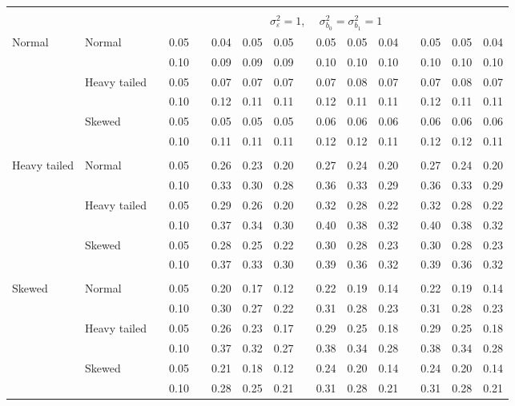 \documentclass[12pt]{article} %
\begin{document}
\begin{table}[ht]
\begin{scriptsize}
\begin{center}
\begin{tabular}{ll p{.1cm} c p{.1cm} rrr p{.1cm} rrr p{.1cm} rrr}
&&&&&&&&&&&&&&&\\
& && && \multicolumn{9}{c}{$\sigma_{\varepsilon}^2 = 1$, \ \ $\sigma_{b_0}^2 = \sigma_{b_1}^2 = 1$} \\ \cline{6-16}
\rowcolor{gray!20}Normal       & Normal       && 0.05 &&   0.04 & 0.05 & 0.05 && 0.05 & 0.05 & 0.04 && 0.05 & 0.05 & 0.04 \\ 
\rowcolor{gray!20}             &              && 0.10 &&   0.09 & 0.09 & 0.09 && 0.10 & 0.10 & 0.10 && 0.10 & 0.10 & 0.10 \\ 
\rowcolor{gray!20}             & Heavy tailed && 0.05 &&   0.07 & 0.07 & 0.07 && 0.07 & 0.08 & 0.07 && 0.07 & 0.08 & 0.07 \\ 
\rowcolor{gray!20}             &              && 0.10 &&   0.12 & 0.11 & 0.11 && 0.12 & 0.11 & 0.11 && 0.12 & 0.11 & 0.11 \\ 
\rowcolor{gray!20}             & Skewed       && 0.05 &&   0.05 & 0.05 & 0.05 && 0.06 & 0.06 & 0.06 && 0.06 & 0.06 & 0.06 \\ 
\rowcolor{gray!20}             &              && 0.10 &&   0.11 & 0.11 & 0.11 && 0.12 & 0.12 & 0.11 && 0.12 & 0.12 & 0.11 \\ 
             &&&&&&&&&&&&&&&\\
Heavy tailed & Normal       && 0.05 &&   0.26 & 0.23 & 0.20 && 0.27 & 0.24 & 0.20 && 0.27 & 0.24 & 0.20 \\ 
             &              && 0.10 &&   0.33 & 0.30 & 0.28 && 0.36 & 0.33 & 0.29 && 0.36 & 0.33 & 0.29 \\ 
             & Heavy tailed && 0.05 &&   0.29 & 0.26 & 0.20 && 0.32 & 0.28 & 0.22 && 0.32 & 0.28 & 0.22 \\ 
             &              && 0.10 &&   0.37 & 0.34 & 0.30 && 0.40 & 0.38 & 0.32 && 0.40 & 0.38 & 0.32 \\ 
             & Skewed       && 0.05 &&   0.28 & 0.25 & 0.22 && 0.30 & 0.28 & 0.23 && 0.30 & 0.28 & 0.23 \\ 
             &              && 0.10 &&   0.37 & 0.33 & 0.30 && 0.39 & 0.36 & 0.32 && 0.39 & 0.36 & 0.32 \\ 
             &&&&&&&&&&&&&&&\\
Skewed       & Normal       && 0.05 &&   0.20 & 0.17 & 0.12 && 0.22 & 0.19 & 0.14 && 0.22 & 0.19 & 0.14 \\ 
             &              && 0.10 &&   0.30 & 0.27 & 0.22 && 0.31 & 0.28 & 0.23 && 0.31 & 0.28 & 0.23 \\ 
             & Heavy tailed && 0.05 &&   0.26 & 0.23 & 0.17 && 0.29 & 0.25 & 0.18 && 0.29 & 0.25 & 0.18 \\ 
             &              && 0.10 &&   0.37 & 0.32 & 0.27 && 0.38 & 0.34 & 0.28 && 0.38 & 0.34 & 0.28 \\ 
             & Skewed       && 0.05 &&   0.21 & 0.18 & 0.12 && 0.24 & 0.20 & 0.14 && 0.24 & 0.20 & 0.14 \\ 
             &              && 0.10 &&   0.28 & 0.25 & 0.21 && 0.31 & 0.28 & 0.21 && 0.31 & 0.28 & 0.21 \\ 



\end{tabular}
\end{center}
\end{scriptsize}
\end{table}
\end{document}
